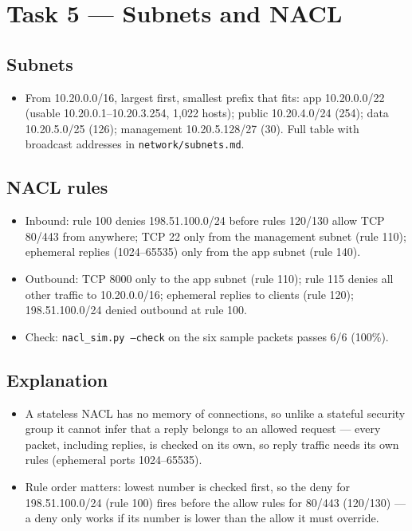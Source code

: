 \documentclass[11pt,a4paper]{article}
\begin{document}
\section{Task 5 --- Subnets and NACL}
\subsection*{Subnets}
\begin{itemize}
\item From 10.20.0.0/16, largest first, smallest prefix that fits: app 10.20.0.0/22 (usable 10.20.0.1--10.20.3.254, 1,022 hosts); public 10.20.4.0/24 (254); data 10.20.5.0/25 (126); management 10.20.5.128/27 (30). Full table with broadcast addresses in \texttt{network/subnets.md}.
\end{itemize}
\subsection*{NACL rules}
\begin{itemize}
\item Inbound: rule 100 denies 198.51.100.0/24 before rules 120/130 allow TCP 80/443 from anywhere; TCP 22 only from the management subnet (rule 110); ephemeral replies (1024--65535) only from the app subnet (rule 140).
\item Outbound: TCP 8000 only to the app subnet (rule 110); rule 115 denies all other traffic to 10.20.0.0/16; ephemeral replies to clients (rule 120); 198.51.100.0/24 denied outbound at rule 100.
\item Check: \texttt{nacl\_sim.py --check} on the six sample packets passes 6/6 (100\%).
\end{itemize}
\subsection*{Explanation}
\begin{itemize}
\item A stateless NACL has no memory of connections, so unlike a stateful security group it cannot infer that a reply belongs to an allowed request --- every packet, including replies, is checked on its own, so reply traffic needs its own rules (ephemeral ports 1024--65535).
\item Rule order matters: lowest number is checked first, so the deny for 198.51.100.0/24 (rule 100) fires before the allow rules for 80/443 (120/130) --- a deny only works if its number is lower than the allow it must override.
\end{itemize}
\end{document}
